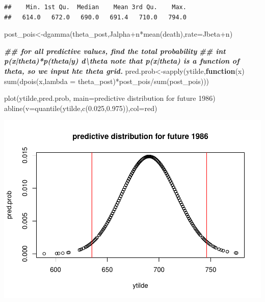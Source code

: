 \documentclass[
]{book}
\newenvironment{Shaded}{\begin{snugshade}}{\end{snugshade}}
\newcommand{\AttributeTok}[1]{\textcolor[rgb]{0.77,0.63,0.00}{#1}}
\newcommand{\ControlFlowTok}[1]{\textcolor[rgb]{0.13,0.29,0.53}{\textbf{#1}}}
\newcommand{\DocumentationTok}[1]{\textcolor[rgb]{0.56,0.35,0.01}{\textbf{\textit{#1}}}}
\newcommand{\FloatTok}[1]{\textcolor[rgb]{0.00,0.00,0.81}{#1}}
\newcommand{\FunctionTok}[1]{\textcolor[rgb]{0.00,0.00,0.00}{#1}}
\newcommand{\NormalTok}[1]{#1}
\newcommand{\OtherTok}[1]{\textcolor[rgb]{0.56,0.35,0.01}{#1}}
\newcommand{\SpecialCharTok}[1]{\textcolor[rgb]{0.00,0.00,0.00}{#1}}
\newcommand{\StringTok}[1]{\textcolor[rgb]{0.31,0.60,0.02}{#1}}
\theoremstyle{definition}
\theoremstyle{definition}
\theoremstyle{definition}
\theoremstyle{definition}
\theoremstyle{remark}
\begin{document}
\begin{verbatim}
##    Min. 1st Qu.  Median    Mean 3rd Qu.    Max. 
##   614.0   672.0   690.0   691.4   710.0   794.0
\end{verbatim}

\begin{Shaded}
\begin{Highlighting}[]
\NormalTok{   post\_pois}\OtherTok{\textless{}{-}}\FunctionTok{dgamma}\NormalTok{(theta\_post,Jalpha}\SpecialCharTok{+}\NormalTok{n}\SpecialCharTok{*}\FunctionTok{mean}\NormalTok{(death),}\AttributeTok{rate=}\NormalTok{Jbeta}\SpecialCharTok{+}\NormalTok{n)}

\DocumentationTok{\#\# for all predictive values,  find the total probability  }
   \DocumentationTok{\#\# int p(x|theta)*p(theta|y) d\textbackslash{}theta  note that p(x|theta) is a function of theta, so we input hte theta grid.}
\NormalTok{ pred.prob}\OtherTok{\textless{}{-}}\FunctionTok{sapply}\NormalTok{(ytilde,}\ControlFlowTok{function}\NormalTok{(x) }\FunctionTok{sum}\NormalTok{(}\FunctionTok{dpois}\NormalTok{(x,}\AttributeTok{lambda =}\NormalTok{ theta\_post)}\SpecialCharTok{*}\NormalTok{post\_pois}\SpecialCharTok{/}\FunctionTok{sum}\NormalTok{(post\_pois)))  }
  
 \FunctionTok{plot}\NormalTok{(ytilde,pred.prob, }\AttributeTok{main=}\StringTok{\textquotesingle{}predictive distribution for future 1986\textquotesingle{}}\NormalTok{)}
 \FunctionTok{abline}\NormalTok{(}\AttributeTok{v=}\FunctionTok{quantile}\NormalTok{(ytilde,}\FunctionTok{c}\NormalTok{(}\FloatTok{0.025}\NormalTok{,}\FloatTok{0.975}\NormalTok{)),}\AttributeTok{col=}\StringTok{\textquotesingle{}red\textquotesingle{}}\NormalTok{)}
\end{Highlighting}
\end{Shaded}

\includegraphics{_main_files/figure-latex/unnamed-chunk-26-2.pdf}
\end{document}
